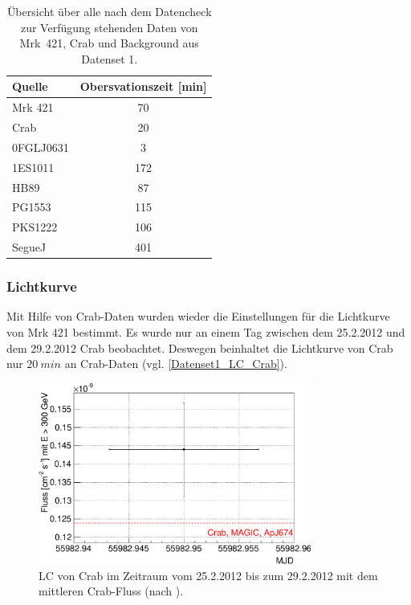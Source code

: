 \begin{table}[!h]
\centering
\caption{Übersicht über alle nach dem Datencheck zur Verfügung stehenden Daten von Mrk~421, Crab und Background aus Datenset 1.}
\label{tab:Datenset1}
\begin{tabular}{lc}
  \toprule
  Quelle & Obersvationszeit [min]\\
  \midrule
  \midrule
  Mrk 421 & 70\\
  \midrule
  Crab & 20\\
  \midrule
  0FGLJ0631 & 3 \\
  1ES1011 & 172 \\
  HB89 & 87 \\
  PG1553 & 115 \\
  PKS1222 & 106 \\
  SegueJ & 401 \\
  \bottomrule
  \bottomrule
\end{tabular}
\end{table}

\subsubsection{Lichtkurve}
Mit Hilfe von Crab-Daten wurden wieder die Einstellungen für die Lichtkurve von Mrk 421 bestimmt.
Es wurde nur an einem Tag zwischen dem 25.2.2012 und dem 29.2.2012 Crab beobachtet.
Deswegen beinhaltet die Lichtkurve von Crab nur $\SI{20}{min}$ an Crab-Daten (vgl. \autoref{Datenset1_LC_Crab}).

\begin{figure}
    \centering
    \includegraphics[width=0.8\textwidth]{./Plots/04_MrkAnalyse/Datenset1/Datenset1_LC_Crab.pdf}
    \caption{LC von Crab im Zeitraum vom 25.2.2012 bis zum 29.2.2012 mit dem mittleren Crab-Fluss (nach \cite{LiteraturreferenzMAGIC}).}
    \label{Datenset1_LC_Crab}
\end{figure}


